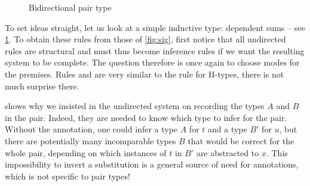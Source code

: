 \begin{figure}
    

  \caption{Bidirectional pair type}
  \label{fig:bidir-pair}
\end{figure}

To set ideas straight, let us look at a simple inductive type: dependent sums – see \cref{fig:bidir-pair}. To obtain these rules from those of \cref{fig:sig},
first notice that all undirected rules are structural and must thus become inference rules if
we want the resulting system to be complete.
The question therefore is once again to choose modes for the premises.
Rules  and  are
very similar to the rule for Π-types, there is not much surprise there.

 shows why we insisted in the undirected system
on recording the types $A$ and $B$ in the pair. Indeed, they are needed to
know which type to infer for the pair. Without the annotation, one could infer a
type $A$ for $t$ and a type $B'$ for $u$, but there are potentially many incomparable types $B$ that would be correct for the whole pair, depending on which instances of $t$ in $B'$ are abstracted to $x$. This impossibility to invert a substitution is a general source of need
for annotations, which is not specific to pair types!

